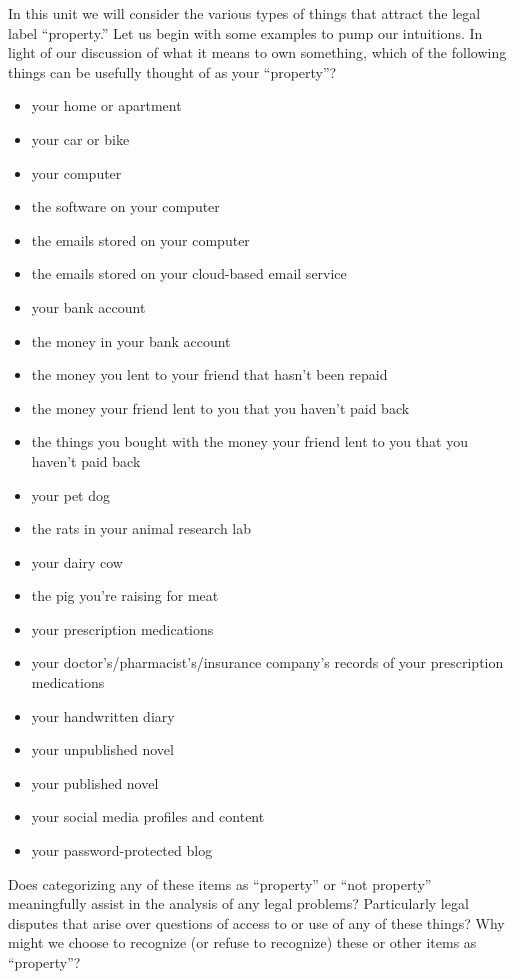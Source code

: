 In this unit we will consider the various types of things that attract the legal
label ``property.'' Let us begin with some examples to pump our intuitions. In
light of our discussion of what it means to own something, which of the
following things can be usefully thought of as your ``property''?
\begin{itemize}
\item your home or apartment
\item your car or bike
\item your computer
\item the software on your computer
\item the emails stored on your computer
\item the emails stored on your cloud-based email service
\item your bank account
\item the money in your bank account
\item the money you lent to your friend that hasn't been repaid
\item the money your friend lent to you that you haven't paid back
\item the things you bought with the money your friend lent to you that you
haven't paid back
\item your pet dog
\item the rats in your animal research lab
\item your dairy cow
\item the pig you're raising for meat
\item your prescription medications
\item your doctor's/pharmacist's/insurance company's records of your
prescription medications
\item your handwritten diary
\item your unpublished novel
\item your published novel
\item your social media profiles and content
\item your password-protected blog
\end{itemize}
Does categorizing any of these items as ``property'' or ``not property''
meaningfully assist in the analysis of any legal problems? Particularly legal
disputes that arise over questions of access to or use of any of these things?
Why might we choose to recognize (or refuse to recognize) these or other items
as ``property''? 

